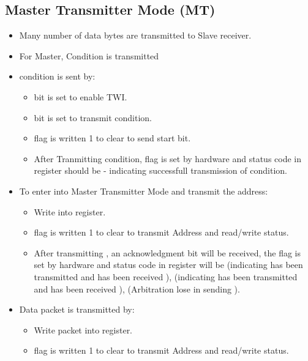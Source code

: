 \subsection{Master Transmitter Mode (MT)}
\begin{itemize}
    \item Many number of data bytes are transmitted to Slave receiver.
    \item For Master,  Condition is transmitted
    \item {} condition is sent by:
    \begin{itemize}
        \item {} bit is set to enable TWI.
        \item {} bit is set to transmit  condition.
        \item {} flag is written 1 to clear to send start bit.
        \item After Tranmitting  condition,  flag is set by hardware and status code in  register should be  - indicating successfull transmission of  condition.
    \end{itemize}
    \item  To enter into Master Transmitter Mode and transmit the address:
    \begin{itemize}
        \item Write  into  register.
        \item {} flag is written 1 to clear to transmit Address and read/write status.
        \item After transmitting , an acknowledgment bit will be received, the  flag is set by hardware and status code in  register will be  (indicating  has been transmitted and  has been received ),  (indicating  has been transmitted and  has been received ),  (Arbitration lose in sending ).
    \end{itemize}
    \item Data packet is transmitted by:
    \begin{itemize}
        \item Write  packet into  register.
        \item {} flag is written 1 to clear to transmit Address and read/write status.

\end{itemize}
\end{itemize}
